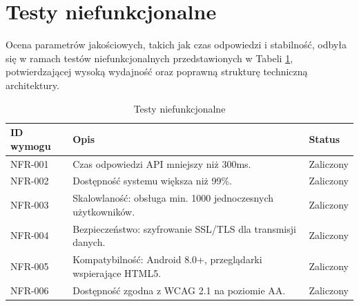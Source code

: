 \section{Testy niefunkcjonalne}
Ocena parametrów jakościowych, takich jak czas odpowiedzi i stabilność, odbyła się w ramach testów niefunkcjonalnych przedstawionych w Tabeli \ref{tab:testyniefunkcjonalne}, potwierdzającej wysoką wydajność oraz poprawną strukturę techniczną architektury.

\begin{table}[ht!]
\centering
\caption{Testy niefunkcjonalne}
\label{tab:testyniefunkcjonalne}
\begin{tabular}{lll}
\toprule
ID wymogu & Opis & Status \\  
\midrule
NFR-001      & Czas odpowiedzi API mniejszy niż 300ms.    & Zaliczony \\
NFR-002      & Dostępność systemu większa niż 99\%.        & Zaliczony \\ 
NFR-003      & Skalowlaność: obsługa min. 1000 jednoczesnych użytkowników.    & Zaliczony \\
NFR-004      & Bezpieczeństwo: szyfrowanie SSL/TLS dla transmisji danych.    & Zaliczony \\
NFR-005      & Kompatybilność: Android 8.0+, przeglądarki wspierające HTML5.	    & Zaliczony \\
NFR-006      & Dostępność zgodna z WCAG 2.1 na poziomie AA.    & Zaliczony \\
\bottomrule 
\end{tabular}
\end{table}